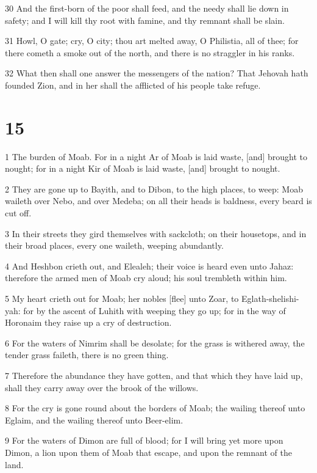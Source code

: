 \par 30 And the first-born of the poor shall feed, and the needy shall lie down in safety; and I will kill thy root with famine, and thy remnant shall be slain.
\par 31 Howl, O gate; cry, O city; thou art melted away, O Philistia, all of thee; for there cometh a smoke out of the north, and there is no straggler in his ranks.
\par 32 What then shall one answer the messengers of the nation? That Jehovah hath founded Zion, and in her shall the afflicted of his people take refuge.

\chapter{15}

\par 1 The burden of Moab. For in a night Ar of Moab is laid waste, [and] brought to nought; for in a night Kir of Moab is laid waste, [and] brought to nought.
\par 2 They are gone up to Bayith, and to Dibon, to the high places, to weep: Moab waileth over Nebo, and over Medeba; on all their heads is baldness, every beard is cut off.
\par 3 In their streets they gird themselves with sackcloth; on their housetops, and in their broad places, every one waileth, weeping abundantly.
\par 4 And Heshbon crieth out, and Elealeh; their voice is heard even unto Jahaz: therefore the armed men of Moab cry aloud; his soul trembleth within him.
\par 5 My heart crieth out for Moab; her nobles [flee] unto Zoar, to Eglath-shelishi-yah: for by the ascent of Luhith with weeping they go up; for in the way of Horonaim they raise up a cry of destruction.
\par 6 For the waters of Nimrim shall be desolate; for the grass is withered away, the tender grass faileth, there is no green thing.
\par 7 Therefore the abundance they have gotten, and that which they have laid up, shall they carry away over the brook of the willows.
\par 8 For the cry is gone round about the borders of Moab; the wailing thereof unto Eglaim, and the wailing thereof unto Beer-elim.
\par 9 For the waters of Dimon are full of blood; for I will bring yet more upon Dimon, a lion upon them of Moab that escape, and upon the remnant of the land.

